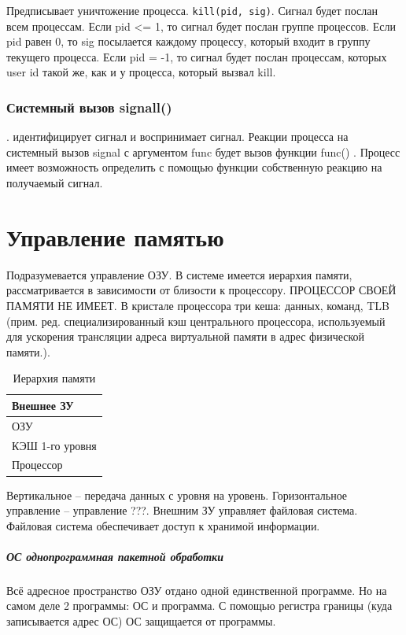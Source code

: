 Предписывает уничтожение процесса.  
\verb|kill(pid, sig)|. Сигнал будет послан всем процессам. Если pid <= 1, то сигнал будет послан группе процессов. Если pid равен 0, то sig посылается каждому процессу, который входит в группу текущего процесса. Если pid = -1,  то сигнал будет послан процессам, которых user id такой же, как и у процесса, который вызвал kill. 

\subsection{Системный вызов signall()}.
идентифицирует сигнал и воспринимает сигнал. Реакции процесса на системный вызов signal с аргументом func будет вызов функции func() . Процесс имеет возможность определить с помощью функции собственную реакцию на получаемый сигнал. 

\chapter{Управление памятью}

Подразумевается управление ОЗУ. В системе имеется иерархия памяти, рассматривается в зависимости от близости к процессору. ПРОЦЕССОР СВОЕЙ ПАМЯТИ НЕ ИМЕЕТ. В кристале процессора три кеша: данных, команд, TLB (прим. ред. специализированный кэш центрального процессора, используемый для ускорения трансляции адреса виртуальной памяти в адрес физической памяти.).

\begin{table}[H]
\caption{Иерархия памяти}
\begin{tabular}{|l|}
\hline
Внешнее ЗУ\\
\hline
ОЗУ\\
\hline
КЭШ 1-го уровня\\
\hline
Процессор\\
\hline
\end{tabular}
\end{table}

Вертикальное – передача данных с уровня на уровень. Горизонтальное управление – управление ???. Внешним ЗУ управляет файловая система. Файловая система обеспечивает доступ к хранимой информации. 

\paragraph{ОС однопрограммная пакетной обработки}
Всё адресное пространство ОЗУ отдано одной единственной программе. Но на самом деле 2 программы: ОС и программа. С помощью регистра границы (куда записывается адрес ОС) ОС защищается от программы.

